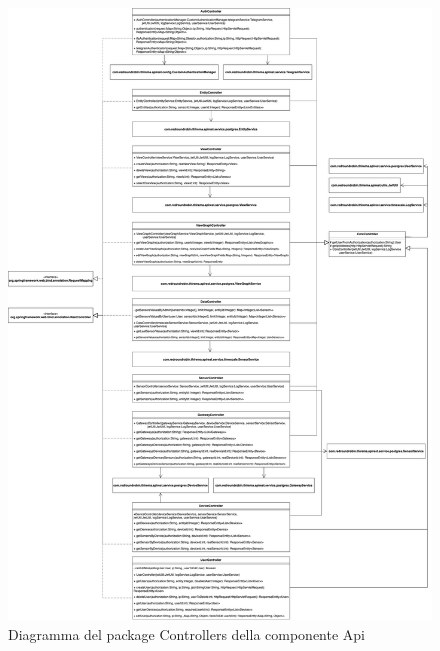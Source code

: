 		\begin{figure}[H]
			\centering
			\includegraphics[scale=0.295]{res/images/API/Controllers.png}
			\caption{Diagramma del package Controllers della componente Api}
			\label{Diagramma 13}
		\end{figure}
